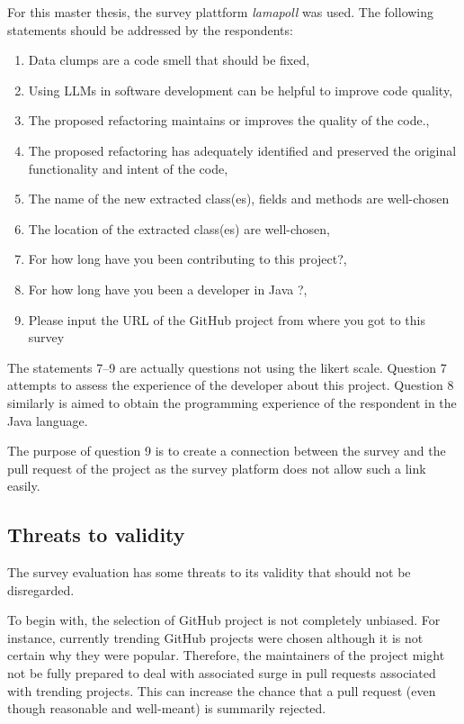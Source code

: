 For this master thesis, the survey plattform \textit{lamapoll} \cite{lamapoll} was used.  The following statements should be addressed by the respondents:
\begin{enumerate}
\item Data clumps are a code smell that should be fixed, 
\item Using LLMs in software development can be helpful to improve code quality,
\item The proposed refactoring maintains or improves the quality of the code.,
\item The proposed refactoring has  adequately identified and preserved the original functionality and intent of the code, 
\item The name of the new extracted class(es), fields and methods are well-chosen
 \item The location of the extracted class(es) are well-chosen,
 \item For how long have you been contributing to this project?,
\item For how long have you been a developer in Java ?, 
\item Please input the URL of the GitHub project from where you got to this survey

\end{enumerate}


The statements 7--9 are actually questions not using the likert scale. Question 7 attempts to assess the experience of the developer about this project. Question 8 similarly is aimed to obtain the programming experience of the respondent in the Java language.

The purpose of question 9 is to create a connection between the survey and the pull request of the project as the survey platform does not allow such a link easily. 
\subsection{Threats to validity}

The survey evaluation has some threats to its validity that should not be disregarded.

To begin with, the selection of GitHub project is not completely unbiased. For instance, currently trending GitHub projects were chosen although it is not certain why they were popular. Therefore, the maintainers of the project might not be fully prepared to deal with associated surge in pull requests associated with trending projects. This can increase the chance that a pull request (even though reasonable and well-meant) is summarily rejected. \cite{10.1145/3366423.3380272}

